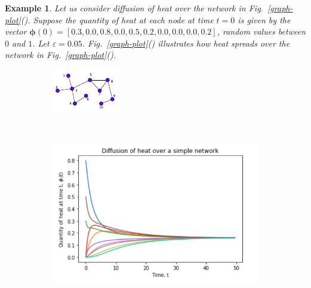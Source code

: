 \documentclass[10pt,a4paper]{article}
\newtheorem{exa}{Example}
\begin{document}
    	 \begin{exa} Let us consider diffusion of heat over the network in Fig.~\ref{graph-plot}(). Suppose the quantity of heat at each node at time $t=0$ is given by the vector $\boldsymbol{\phi}(0)= [0.3,0.0,0.8,0.0,0.5,0.2,0.0,0.0,0.0,0.2]$, random values between $0$ and $1$. Let $\varepsilon=0.05$. Fig.~\ref{graph-plot}() illustrates how heat spreads over the network in Fig.~\ref{graph-plot}(). 
    	 	
    	 	\begin{figure}[H]
    	 		\centering
    	 		\begin{subfigure}[b]{0.29\textwidth}
    	 			\includegraphics[width=\textwidth]{images/diffusion-graph.pdf}
    	 			\caption{}
    	 			\label{difn-graph}
    	 		\end{subfigure}~
    	 		\begin{subfigure}[b]{0.45\textwidth}
    	 			\includegraphics[width= \textwidth]{images/Diffusion-on-network-new.png}

\end{subfigure}
\end{figure}
\end{exa}
\end{document}
